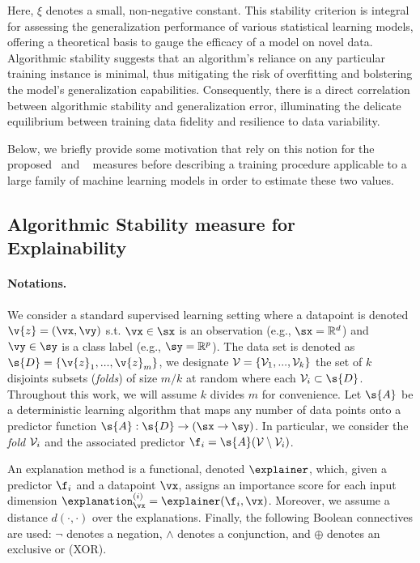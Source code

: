 Here, $\xi$ denotes a small, non-negative constant. This stability criterion is integral for assessing the generalization performance of various statistical learning models, offering a theoretical basis to gauge the efficacy of a model on novel data. Algorithmic stability suggests that an algorithm's reliance on any particular training instance is minimal, thus mitigating the risk of overfitting and bolstering the model's generalization capabilities. Consequently, there is a direct correlation between algorithmic stability and generalization error, illuminating the delicate equilibrium between training data fidelity and resilience to data variability.

Below, we briefly provide some motivation that rely on this notion for the proposed  \mege~and \reco~ measures before describing a training procedure applicable to a large family of machine learning models in order to estimate these two values. 

\subsection{Algorithmic Stability measure for Explainability}


\paragraph{Notations.} We consider a standard supervised learning setting where a datapoint is denoted $\v{z} = (\vx, \vy)$ s.t. $\vx \in \sx$ is an observation (e.g., $\sx = \mathbb{R}^d$) and $\vy \in \sy$ is a class label (e.g., $\sy = \mathbb{R}^p$).
The data set is denoted as $\s{D} = \{ \v{z}_1, ..., \v{z}_m \}$,  we designate $\mathcal{V} = \{ \mathcal{V}_1, ..., \mathcal{V}_k \}$ the set of $k$ disjoints subsets (\textit{folds}) of size $m/k$ at random where each $\fold_i \subset \s{D}$. Throughout this work, we will assume $k$ divides $m$ for convenience.
Let $\s{A}$ be a deterministic learning algorithm that maps any number of data points onto a predictor function $\s{A} : \s{D} \to (\sx \to \sy)$.
In particular, we consider the \textit{fold} $\mathcal{V}_i$ and the associated predictor $\f_i = \s{A}(\fold \setminus \fold_i)$.

An explanation method is a functional, denoted $\explainer$, which, given a predictor $\f_i$ and a datapoint $\vx$, assigns an importance score for each input dimension $\explanation_{\vx}^{(i)} = \explainer(\f_i, \vx)$. Moreover, we assume a distance $d(\cdot,\cdot)$ over the explanations.
Finally, the following Boolean connectives are used: $\neg$ denotes a negation, $\land$ denotes a conjunction, and $\oplus$ denotes an exclusive or (XOR).

